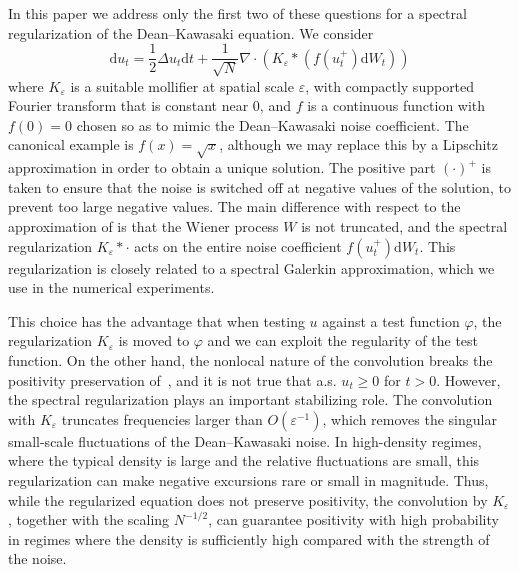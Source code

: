 \documentclass[a4paper,12pt]{article}
\newcommand{\mathd}{\mathrm{d}}
\begin{document}
In this paper we address only the first two of these questions for a spectral regularization of the Dean--Kawasaki equation. We consider
\begin{equation}\label{eq:approx_DK}
    \mathd u_t = \frac{1}{2} \Delta u _t \mathd t + \frac{1}{\sqrt{N}} \nabla \cdot (K_\varepsilon \ast (f(u_t^+)\mathd W_t)) 
\end{equation}
where $K_\varepsilon$ is a suitable mollifier at spatial scale $\varepsilon$, with compactly supported Fourier transform that is constant near $0$, and $f$ is a continuous function with $f(0)=0$ chosen so as to mimic the Dean--Kawasaki noise coefficient. The canonical example is  $f(x) = \sqrt{x}$, although we may replace this by a Lipschitz approximation in order to obtain a unique solution. The positive part $(\cdot)^+$ is taken to ensure that the noise is switched off at negative values of the solution, to prevent too large negative values. The main difference with respect to the approximation of \cite{Djurdjevac2024} is that the Wiener process $W$ is not truncated, and the spectral regularization $K_\varepsilon \ast \cdot$ acts on the entire noise coefficient $f(u_t^+)\mathd W_t$. This regularization is closely related to a spectral Galerkin approximation, which we use in the numerical experiments.

This choice has the advantage that when testing $u$ against a test function $\varphi$, the regularization $K_\varepsilon$ is moved to $\varphi$ and we can exploit the regularity of the test function. On the other hand, the nonlocal nature of the convolution breaks the positivity preservation of~\cite{Djurdjevac2024}, and it is not true that a.s. $u_t \geq 0$ for $t>0$. However, the spectral regularization plays an important stabilizing role. The convolution with $K_\varepsilon$ truncates frequencies larger than $O(\varepsilon^{-1})$, which removes the singular small-scale fluctuations of the Dean--Kawasaki noise. 
In high-density regimes, where the typical density is large and the relative fluctuations are small, this regularization can make negative excursions rare or small in magnitude. Thus, while the regularized equation does not preserve positivity, the convolution by $K_\varepsilon$, together with the scaling $N^{-1/2}$, can guarantee positivity with high probability in regimes where the density is sufficiently high compared with the strength of the noise.
\end{document}
